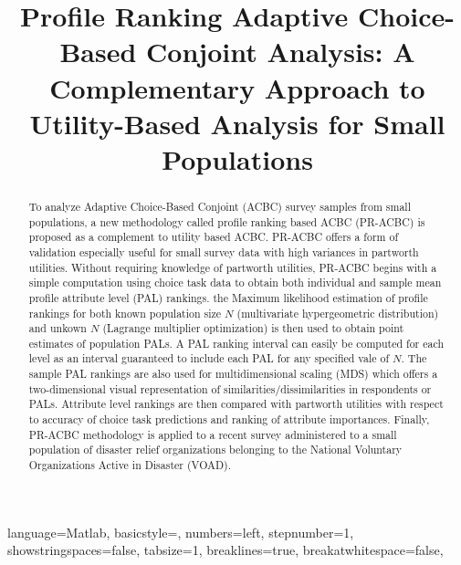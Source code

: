 \documentclass[a4paper, 12pt]{article}
\title {Profile Ranking Adaptive Choice-Based Conjoint Analysis: A Complementary Approach to Utility-Based Analysis for Small Populations}
\author[1]{}
\date{}
\begin{document}
\lstset
{ %
    language=Matlab,
    basicstyle=\scriptsize,
    numbers=left,
    stepnumber=1,
    showstringspaces=false,
    tabsize=1,
    breaklines=true,
    breakatwhitespace=false,
}
\maketitle
\hrulefill



 \vspace{.7in}

 \begin{abstract}
To analyze Adaptive Choice-Based Conjoint (ACBC) survey samples from small populations, a new methodology called profile ranking based ACBC (PR-ACBC) is proposed as a complement to utility based  ACBC. PR-ACBC offers a form of validation especially useful for small survey data with high variances in partworth utilities. Without requiring knowledge of partworth utilities, PR-ACBC begins with a simple computation using choice task data to obtain both individual and sample mean profile attribute level (PAL) rankings. the Maximum likelihood estimation of profile rankings for both known population size $N$ (multivariate hypergeometric distribution) and unkown $N$ (Lagrange multiplier optimization) is then used to obtain point estimates of population PALs. A PAL ranking interval can easily be computed  for each level as an interval guaranteed to include  each PAL for any specified vale of $N$. The sample PAL rankings are also used  for  multidimensional scaling (MDS) which offers a two-dimensional visual representation of similarities/dissimilarities in respondents or PALs.  Attribute level rankings are then compared with partworth utilities with respect to accuracy of choice task predictions and ranking of attribute importances. Finally, PR-ACBC methodology is applied to a recent survey administered to  a small population of disaster relief organizations belonging to the National Voluntary Organizations Active in Disaster (VOAD).

\end{abstract}


\end{document}
